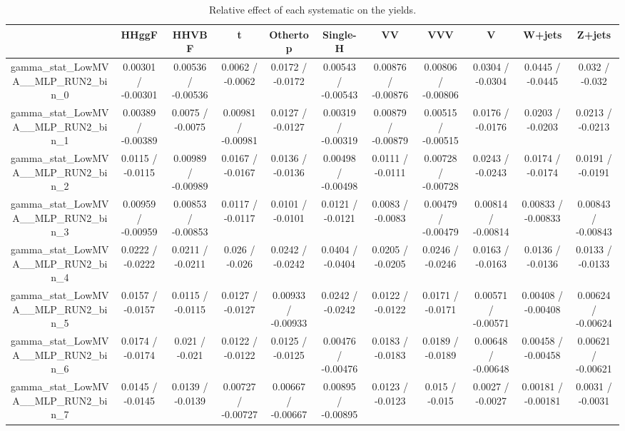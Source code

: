\documentclass[10pt]{article}
\begin{document}
\begin{table}[htbp]
\begin{center}
\begin{tabular}{|c|c|c|c|c|c|c|c|c|c|c|}
\hline 
      & HHggF      & HHVBF      & t      & Othertop      & Single-H      & VV      & VVV      & V      & W+jets      & Z+jets \\ 
\hline 
  gamma_stat_LowMVA__MLP_RUN2_bin_0 & 0.00301 / -0.00301 & 0.00536 / -0.00536 & 0.0062 / -0.0062 & 0.0172 / -0.0172 & 0.00543 / -0.00543 & 0.00876 / -0.00876 & 0.00806 / -0.00806 & 0.0304 / -0.0304 & 0.0445 / -0.0445 & 0.032 / -0.032 \\ 
  gamma_stat_LowMVA__MLP_RUN2_bin_1 & 0.00389 / -0.00389 & 0.0075 / -0.0075 & 0.00981 / -0.00981 & 0.0127 / -0.0127 & 0.00319 / -0.00319 & 0.00879 / -0.00879 & 0.00515 / -0.00515 & 0.0176 / -0.0176 & 0.0203 / -0.0203 & 0.0213 / -0.0213 \\ 
  gamma_stat_LowMVA__MLP_RUN2_bin_2 & 0.0115 / -0.0115 & 0.00989 / -0.00989 & 0.0167 / -0.0167 & 0.0136 / -0.0136 & 0.00498 / -0.00498 & 0.0111 / -0.0111 & 0.00728 / -0.00728 & 0.0243 / -0.0243 & 0.0174 / -0.0174 & 0.0191 / -0.0191 \\ 
  gamma_stat_LowMVA__MLP_RUN2_bin_3 & 0.00959 / -0.00959 & 0.00853 / -0.00853 & 0.0117 / -0.0117 & 0.0101 / -0.0101 & 0.0121 / -0.0121 & 0.0083 / -0.0083 & 0.00479 / -0.00479 & 0.00814 / -0.00814 & 0.00833 / -0.00833 & 0.00843 / -0.00843 \\ 
  gamma_stat_LowMVA__MLP_RUN2_bin_4 & 0.0222 / -0.0222 & 0.0211 / -0.0211 & 0.026 / -0.026 & 0.0242 / -0.0242 & 0.0404 / -0.0404 & 0.0205 / -0.0205 & 0.0246 / -0.0246 & 0.0163 / -0.0163 & 0.0136 / -0.0136 & 0.0133 / -0.0133 \\ 
  gamma_stat_LowMVA__MLP_RUN2_bin_5 & 0.0157 / -0.0157 & 0.0115 / -0.0115 & 0.0127 / -0.0127 & 0.00933 / -0.00933 & 0.0242 / -0.0242 & 0.0122 / -0.0122 & 0.0171 / -0.0171 & 0.00571 / -0.00571 & 0.00408 / -0.00408 & 0.00624 / -0.00624 \\ 
  gamma_stat_LowMVA__MLP_RUN2_bin_6 & 0.0174 / -0.0174 & 0.021 / -0.021 & 0.0122 / -0.0122 & 0.0125 / -0.0125 & 0.00476 / -0.00476 & 0.0183 / -0.0183 & 0.0189 / -0.0189 & 0.00648 / -0.00648 & 0.00458 / -0.00458 & 0.00621 / -0.00621 \\ 
  gamma_stat_LowMVA__MLP_RUN2_bin_7 & 0.0145 / -0.0145 & 0.0139 / -0.0139 & 0.00727 / -0.00727 & 0.00667 / -0.00667 & 0.00895 / -0.00895 & 0.0123 / -0.0123 & 0.015 / -0.015 & 0.0027 / -0.0027 & 0.00181 / -0.00181 & 0.0031 / -0.0031 \\ 
\hline 
\end{tabular} 
\caption{Relative effect of each systematic on the yields.} 
\end{center} 
\end{table} 
\end{document}

